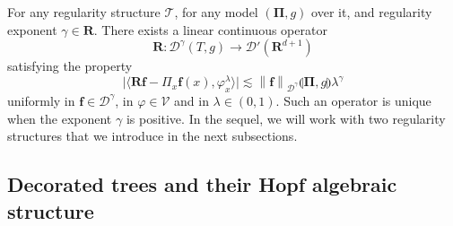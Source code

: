 \documentclass[11pt]{preprint}
\newcommand{\mcV}{\mathcal{V}}
\newcommand{\mcD}{\mathcal{D}}
\def\PPi{\boldsymbol{\Pi}}
\newcommand{\bfR}{\mathbf{R}}
\newcommand{\scrT}{\mathscr{T}}
\newcommand{\norme}[1]{\left\lVert #1 \right\lVert}
\begin{document}
For any regularity structure $\scrT$, for any model $(\PPi,g)$ over it,
and regularity exponent $\gamma\in\bfR$. There exists a linear continuous operator \label{reconstrcution_op}
$$
{\bm R} : \mcD^\gamma(T,{ g})  \to \mcD'(\bfR^{d+1})
$$
satisfying the property
$$ 
\big|\langle {\bm R} {\bm f} - { \Pi}_x{\bm f}(x) , \varphi_x^\lambda \rangle \big|  \lesssim \norme{\bm f}_{\mcD^\gamma}\llparenthesis \PPi,g\rrparenthesis\lambda^\gamma
$$ 
uniformly in ${\bm f}\in\mcD^\gamma$, in $\varphi\in \mcV $ and in $\lambda\in (0,1)$. Such an operator is unique when the exponent $\gamma$
is positive.
	In the sequel, we will work with two regularity structures that we introduce in the next subsections.	





	
	
	
	
	
	
	\subsection{Decorated trees and their Hopf algebraic structure}	\label{subsection_DecoratedTrees}		
	
\end{document}
